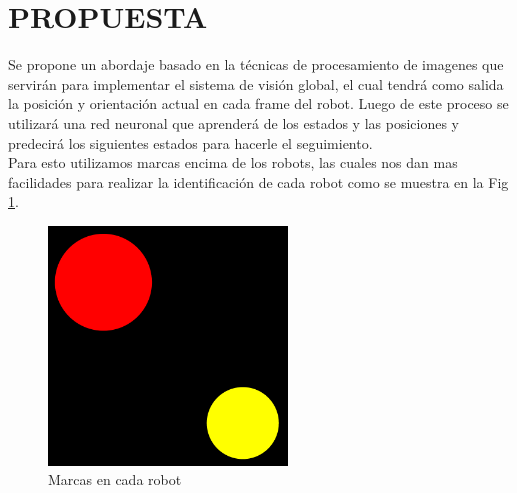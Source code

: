 \documentclass[conference]{IEEEtran}
\begin{document}
\section{PROPUESTA}
Se propone un abordaje basado en la t\'ecnicas de procesamiento de imagenes que servir\'an para implementar el sistema de visi\'on global, el cual tendr\'a como salida la posici\'on y orientaci\'on actual en cada frame del robot. Luego de este proceso se utilizar\'a una red neuronal  que aprender\'a de los estados y las posiciones y predecir\'a los siguientes estados para hacerle el seguimiento.\\
Para esto utilizamos marcas encima de los robots, las cuales nos dan mas facilidades para realizar la identificaci\'on de cada robot como se muestra en la Fig \ref{fig_mar}.
	\begin{figure}
	\centering
	\includegraphics[width=2.5in]{imagen1.pdf}
	
	\caption{Marcas en cada robot}
	\label{fig_mar}
\end{figure}
\end{document}

